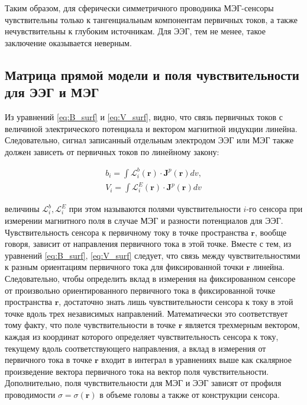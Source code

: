 Таким образом, для сферически симметричного проводника МЭГ-сенсоры чувствительны
только к тангенциальным компонентам первичных токов, а также нечувствительны к глубоким источникам.
Для ЭЭГ, тем не менее, такое заключение оказывается неверным.


\subsection{Матрица прямой модели и поля чувствительности для ЭЭГ и МЭГ}
Из уравнений \ref{eq:B_surf} и \ref{eq:V_surf}, видно, что связь первичных токов с величиной электрического
потенциала и вектором магнитной индукции линейна. Следовательно, сигнал записанный отдельным
электродом ЭЭГ или МЭГ также должен зависеть от первичных токов по линейному закону:

\begin{gather}
    b_i = \int \mathbf{\mathcal{L}}_i^b(\mathbf{r}) \cdot \mathbf{J}^p(\mathbf{r})dv, \\
    V_i = \int \mathbf{\mathcal{L}}_i^E(\mathbf{r}) \cdot \mathbf{J}^p(\mathbf{r})dv
    \label{eq:lf_int}
\end{gather}

величины $\mathbf{\mathcal{L}}_i^b, \mathbf{\mathcal{L}}_i^E$
при этом называются полями чувствительности $i$-го сенсора при измерении магнитного поля
в случае МЭГ и разности потенциалов для ЭЭГ. Чувствительность сенсора к первичному току
в точке пространства $\mathbf{r}$, вообще говоря, зависит от направления первичного тока в этой точке.
Вместе с тем, из уравнений \ref{eq:B_surf}, \ref{eq:V_surf} следует, что связь между чувствительностями
к разным ориентациям первичного тока для фиксированной точки $\mathbf{r}$ линейна. Следовательно,
чтобы определить вклад в измерения на фиксированном сенсоре от произвольно ориентированного первичного тока
в фиксированной точке пространства $\mathbf{r}$,
достаточно знать лишь чувствительности сенсора к току в этой точке вдоль трех независимых направлений.
Математически это соответствует тому факту, что поле чувствительности в точке $\mathbf{r}$ является
трехмерным вектором, каждая из координат которого определяет чувствительность сенсора к току, текущему
вдоль соответствующего направления, а вклад в измерения от первичного тока в точке $\mathbf{r}$
входит в интеграл в уравнениях выше как скалярное произведение вектора первичного тока на вектор
поля чувствительности.
Дополнительно, поля чувствительности для МЭГ и ЭЭГ зависят от профиля проводимости $\sigma=\sigma(\mathbf{r})$
в объеме головы а также от конструкции сенсора.

